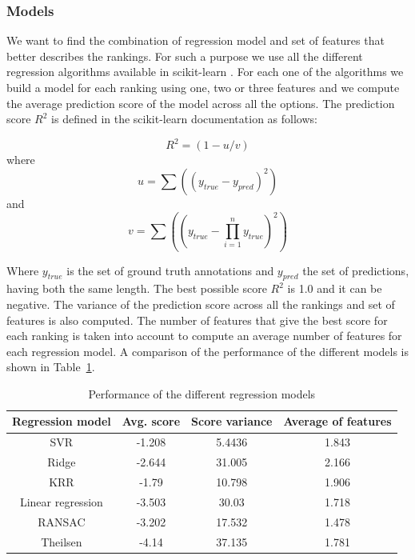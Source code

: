\documentclass{article}
\begin{document}
\subsubsection{Models}
We want to find the combination of regression model and set of features that better describes the rankings. For such a purpose we use all the different regression algorithms available in scikit-learn \cite{08}.  For each one of the algorithms we build a model for each ranking using one, two or three features and we compute the average prediction score of the model across all the options. The prediction score $R^2$ is defined in the scikit-learn documentation as follows:

\begin{equation}
 R^2 = (1 - u/v) 
\end{equation}
where
\begin{equation}
	u = \sum\nolimits((y_{true} - y_{pred})^2)
\end{equation}
and
\begin{equation}
	v = \sum\nolimits((y_{true} - \prod\limits_{i=1}^n y_{true})^2)
\end{equation}

Where $y_{true}$ is the set of ground truth annotations and $y_{pred}$ the set of predictions, having both the same length. The best possible score $R^2$ is 1.0 and it can be negative.
The variance of the prediction score across all the rankings and set of features is also computed. 
The number of features that give the best score for each ranking is taken into account to compute an average number of features for each regression model. A comparison of the performance of the different models is shown in Table~\ref{models}.

\begin{table}[]
\centering
\label{my-label}
\begin{tabular}{cccc}
\hline
Regression model  & Avg. score & Score variance & Average of features \\ \hline
SVR               & -1.208     & 5.4436         & 1.843               \\
Ridge             & -2.644     & 31.005         & 2.166               \\
KRR               & -1.79      & 10.798         & 1.906               \\
Linear regression & -3.503     & 30.03          & 1.718               \\
RANSAC            & -3.202     & 17.532         & 1.478               \\
Theilsen          & -4.14      & 37.135         & 1.781               \\ \hline
\end{tabular}
\caption{Performance of the different regression models}
\label{models}
\end{table}
\end{document}
